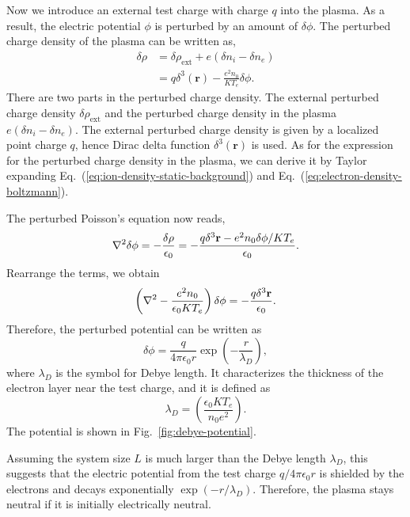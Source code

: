 Now we introduce an external test charge with charge $q$ into the plasma. As a result, the electric potential $\phi$ is perturbed by an amount of $\delta\phi$. The perturbed charge density of the plasma can be written as,
\begin{equation}
	\begin{aligned}
		\delta\rho & = \delta\rho_{\text{ext}} + e(\delta n_i - \delta n_e)   \\
		           & = q\delta^3(\mathbf{r}) - \frac{e^2n_0}{KT_e}\delta\phi.
	\end{aligned}
\end{equation}
There are two parts in the perturbed charge density. The external perturbed charge density $\delta\rho_{\text{ext}}$ and the perturbed charge density in the plasma $e(\delta n_i - \delta n_e)$. The external perturbed charge density is given by a localized point charge $q$, hence Dirac delta function $\delta^3(\mathbf{r})$ is used. As for the expression for the perturbed charge density in the plasma, we can derive it by Taylor expanding Eq.~(\ref{eq:ion-density-static-background}) and Eq.~(\ref{eq:electron-density-boltzmann}).

The perturbed Poisson's equation now reads,
\begin{equation}
	\laplacian \delta\phi = - \frac{\delta \rho}{\epsilon_0} = - \frac{q\delta^3{\mathbf{r}} - e^2n_0\delta\phi/KT_e}{\epsilon_0}.
\end{equation}
Rearrange the terms, we obtain
\begin{equation}
	\left(\laplacian - \frac{e^2n_0}{\epsilon_0KT_e} \right)\delta\phi = -\frac{q\delta^3{\mathbf{r}}}{\epsilon_0}.
\end{equation}
Therefore, the perturbed potential can be written as
\begin{equation}
	\delta\phi = \frac{q}{4\pi\epsilon_0r}\exp(-\frac{r}{\lambda_D}),
\end{equation}
where $\lambda_D$ is the symbol for Debye length. It characterizes the thickness of the electron layer near the test charge, and it is defined as
\begin{equation}
	\lambda_D = \left(\frac{\epsilon_0KT_e}{n_0e^2}\right).
\end{equation}
The potential is shown in Fig.~\ref{fig:debye-potential}.

Assuming the system size $L$ is much larger than the Debye length $\lambda_D$, this suggests that the electric potential from the test charge $q/4\pi\epsilon_0r$ is shielded by the electrons and decays exponentially $\exp(-r/\lambda_D)$. Therefore, the plasma stays neutral if it is initially electrically neutral.

